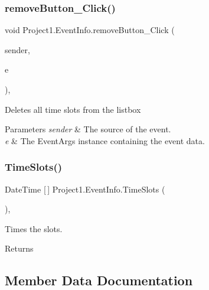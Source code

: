 \subsubsection{\texorpdfstring{remove\+Button\+\_\+\+Click()}{removeButton\_Click()}}
{\footnotesize\ttfamily void Project1.\+Event\+Info.\+remove\+Button\+\_\+\+Click (\begin{DoxyParamCaption}\item[{object}]{sender,  }\item[{Event\+Args}]{e }\end{DoxyParamCaption})\hspace{0.3cm}{\ttfamily [inline]}, {\ttfamily [private]}}



Deletes all time slots from the listbox 


\begin{DoxyParams}{Parameters}
{\em sender} & The source of the event.\\
\hline
{\em e} & The Event\+Args instance containing the event data.\\
\hline
\end{DoxyParams}
\mbox{\label{classProject1_1_1EventInfo_a12da689af1a5f87c244d014247cf4f73}} 
\subsubsection{\texorpdfstring{Time\+Slots()}{TimeSlots()}}
{\footnotesize\ttfamily Date\+Time \mbox{[}$\,$\mbox{]} Project1.\+Event\+Info.\+Time\+Slots (\begin{DoxyParamCaption}{ }\end{DoxyParamCaption})\hspace{0.3cm}{\ttfamily [inline]}, {\ttfamily [private]}}



Times the slots. 

\begin{DoxyReturn}{Returns}

\end{DoxyReturn}


\subsection{Member Data Documentation}
\mbox{\label{classProject1_1_1EventInfo_a1b28ec9d90e8ff63e7589515f7b6f64a}} 
